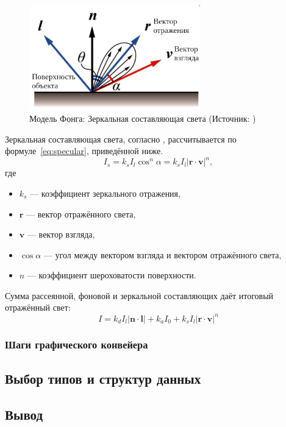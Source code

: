\begin{figure}[H]
	\centering
	\includegraphics[width=0.66\textwidth]{img/specular_ru}
    \caption{Модель Фонга: Зеркальная составляющая света (Источник: \cite{phong})}
	\label{fig:specular}
\end{figure}

Зеркальная составляющая света, согласно \cite{phong}, рассчитывается по формуле~\ref{eq:specular}, приведённой ниже.
\begin{equation}
    I_s = k_s I_l \cos^n \alpha = k_s I_l \left| \boldsymbol{r} \cdot \boldsymbol{v} \right|^n,
    \label{eq:specular}
\end{equation}
где
\begin{itemize}
    \item $k_s$ --- коэффициент зеркального отражения,
    \item $\boldsymbol{r}$ --- вектор отражённого света,
    \item $\boldsymbol{v}$ --- вектор взгляда,
    \item $\cos \alpha$ --- угол между вектором взгляда и вектором отражённого света,
    \item $n$ --- коэффициент шероховатости поверхности.
\end{itemize}

Сумма рассеянной, фоновой и зеркальной составляющих даёт итоговый отражённый свет:
\begin{equation}
    I = k_d I_l \left| \boldsymbol{n} \cdot \boldsymbol{l} \right| + k_a I_0 + k_s I_l \left| \boldsymbol{r} \cdot \boldsymbol{v} \right|^n
    \label{eq:phong}
\end{equation}

\subsubsection{Шаги графического конвейера}

\subsection{Выбор типов и структур данных}



\subsection*{Вывод}

